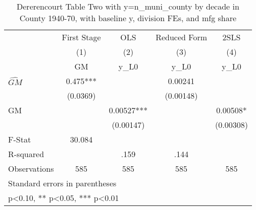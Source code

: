 \begin{table}[htbp]\centering
\def\sym#1{\ifmmode^{#1}\else\(^{#1}\)\fi}
\caption{Dererencourt Table Two with y=n\_muni\_county by decade in County 1940-70, with baseline y, division FEs, and mfg share}
\begin{tabular}{l*{4}{c}}
\toprule
                    & First Stage   &         OLS   &Reduced Form   &        2SLS   \\
                    &\multicolumn{1}{c}{(1)}&\multicolumn{1}{c}{(2)}&\multicolumn{1}{c}{(3)}&\multicolumn{1}{c}{(4)}\\
                    &\multicolumn{1}{c}{GM}&\multicolumn{1}{c}{y\_L0}&\multicolumn{1}{c}{y\_L0}&\multicolumn{1}{c}{y\_L0}\\
\midrule
$\hat{GM}$          &       0.475***&               &     0.00241   &               \\
                    &    (0.0369)   &               &   (0.00148)   &               \\
\addlinespace
GM                  &               &     0.00527***&               &     0.00508*  \\
                    &               &   (0.00147)   &               &   (0.00308)   \\
\midrule
F-Stat              &      30.084   &               &               &               \\
R-squared           &               &        .159   &        .144   &               \\
Observations        &         585   &         585   &         585   &         585   \\
\bottomrule
\multicolumn{5}{l}{\footnotesize Standard errors in parentheses}\\
\multicolumn{5}{l}{\footnotesize * p<0.10, ** p<0.05, *** p<0.01}\\
\end{tabular}
\end{table}
